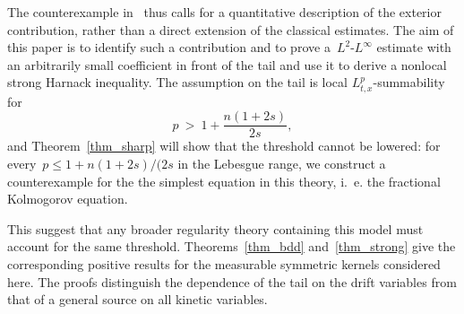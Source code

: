 \documentclass[leqno,10pt]{amsart}
\theoremstyle{plain}
\theoremstyle{remark}
\numberwithin{equation}{section}
\begin{document}
\medskip

The counterexample in~\cite{KW24c} thus calls for a quantitative description of the exterior contribution, rather than a direct extension of the classical estimates. The aim of this paper is to identify such a contribution and to prove a~$L^2$-$L^\infty$ estimate with an arbitrarily small coefficient in front of the tail and use it to derive a nonlocal strong Harnack inequality.
The assumption on the tail is local $L^{p}_{t,x}$-summability for
$$
p \ >  \ 1 + \frac{n(1+2s)}{2s},
$$
and Theorem~\ref{thm_sharp} will show that the threshold cannot be lowered: for every~$p \leq 1 + n(1+2s)/(2s$ in the Lebesgue range, we construct a counterexample for the the simplest equation in this theory, i.~\!e. the fractional Kolmogorov equation.
 
This suggest that any broader regularity theory containing this model must account for the same threshold.
Theorems~\ref{thm_bdd} and~\ref{thm_strong} give the corresponding positive results for the measurable symmetric kernels considered here. The proofs distinguish the dependence of the tail on the drift variables from that of a general source on all kinetic variables.
\end{document}
